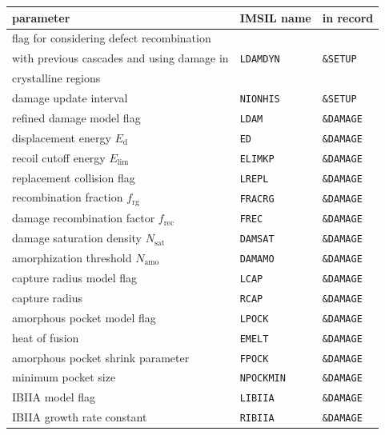 \begin{center}
\begin{tabular}{lll}
   parameter \quad                            & IMSIL name   & in record \\
   \hline
   flag for considering defect recombination  &                               \\
   with previous cascades and using damage in & {\tt LDAMDYN}& {\tt \&SETUP}  \\
   crystalline regions                        &                               \\
   damage update interval                     & {\tt NIONHIS}& {\tt \&SETUP} \\
   refined damage model flag                  & {\tt LDAM}   & {\tt \&DAMAGE} \\
   displacement energy $E_\mathrm{d}$         & {\tt ED}     & {\tt \&DAMAGE} \\
   recoil cutoff energy $E_\mathrm{lim}$      & {\tt ELIMKP} & {\tt \&DAMAGE} \\
   replacement collision flag                 & {\tt LREPL}  & {\tt \&DAMAGE} \\
   recombination fraction $f_\mathrm{rg}$     & {\tt FRACRG} & {\tt \&DAMAGE} \\
   damage recombination factor $f_\mathrm{rec}$ & {\tt FREC} & {\tt \&DAMAGE} \\
   damage saturation density $N_\mathrm{sat}$ & {\tt DAMSAT} & {\tt \&DAMAGE} \\
   amorphization threshold $N_\mathrm{amo}$   & {\tt DAMAMO} & {\tt \&DAMAGE} \\
   capture radius model flag                  & {\tt LCAP}   & {\tt \&DAMAGE} \\
   capture radius                             & {\tt RCAP}   & {\tt \&DAMAGE} \\
   amorphous pocket model flag                & {\tt LPOCK}  & {\tt \&DAMAGE} \\
   heat of fusion                             & {\tt EMELT}  & {\tt \&DAMAGE} \\
   amorphous pocket shrink parameter          & {\tt FPOCK}  & {\tt \&DAMAGE} \\
   minimum pocket size                      & {\tt NPOCKMIN} & {\tt \&DAMAGE} \\
   IBIIA model flag                           & {\tt LIBIIA} & {\tt \&DAMAGE} \\
   IBIIA growth rate constant                 & {\tt RIBIIA} & {\tt \&DAMAGE} \\
\end{tabular}
\end{center}
